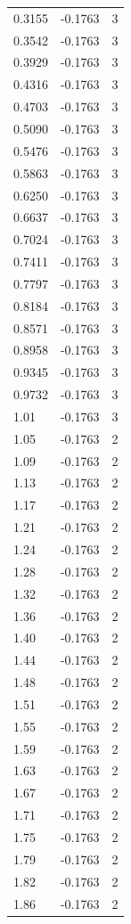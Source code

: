\begin{longtable}{lrr}
  0.3155 & -0.1763 & 3 \\
  0.3542 & -0.1763 & 3 \\
  0.3929 & -0.1763 & 3 \\
  0.4316 & -0.1763 & 3 \\
  0.4703 & -0.1763 & 3 \\
  0.5090 & -0.1763 & 3 \\
  0.5476 & -0.1763 & 3 \\
  0.5863 & -0.1763 & 3 \\
  0.6250 & -0.1763 & 3 \\
  0.6637 & -0.1763 & 3 \\
  0.7024 & -0.1763 & 3 \\
  0.7411 & -0.1763 & 3 \\
  0.7797 & -0.1763 & 3 \\
  0.8184 & -0.1763 & 3 \\
  0.8571 & -0.1763 & 3 \\
  0.8958 & -0.1763 & 3 \\
  0.9345 & -0.1763 & 3 \\
  0.9732 & -0.1763 & 3 \\
  1.01 & -0.1763 & 3 \\
  1.05 & -0.1763 & 2 \\
  1.09 & -0.1763 & 2 \\
  1.13 & -0.1763 & 2 \\
  1.17 & -0.1763 & 2 \\
  1.21 & -0.1763 & 2 \\
  1.24 & -0.1763 & 2 \\
  1.28 & -0.1763 & 2 \\
  1.32 & -0.1763 & 2 \\
  1.36 & -0.1763 & 2 \\
  1.40 & -0.1763 & 2 \\
  1.44 & -0.1763 & 2 \\
  1.48 & -0.1763 & 2 \\
  1.51 & -0.1763 & 2 \\
  1.55 & -0.1763 & 2 \\
  1.59 & -0.1763 & 2 \\
  1.63 & -0.1763 & 2 \\
  1.67 & -0.1763 & 2 \\
  1.71 & -0.1763 & 2 \\
  1.75 & -0.1763 & 2 \\
  1.79 & -0.1763 & 2 \\
  1.82 & -0.1763 & 2 \\
  1.86 & -0.1763 & 2 \\

\end{longtable}
